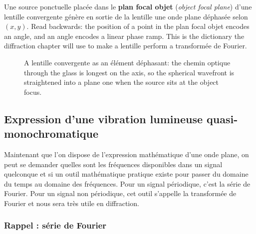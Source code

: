 \begin{conclusion}
  Une source ponctuelle placée dans le \textbf{plan focal objet}
  (\textit{object focal plane}) d'une lentille convergente génère en sortie de
  la lentille une onde plane déphasée selon $(x,y)$. Read backwards: the
  position of a point in the plan focal objet encodes an angle, and an angle
  encodes a linear phase ramp. This is the dictionary the diffraction chapter
  will use to make a lentille perform a transformée de Fourier.
\end{conclusion}

\begin{figure}[h!]
  \centering
  \caption*{\small A lentille convergente as an élément déphasant: the chemin
  optique through the glass is longest on the axis, so the spherical wavefront
  is straightened into a plane one when the source sits at the object focus.}
\end{figure}

\subsection{Expression d'une vibration lumineuse quasi-monochromatique}

Maintenant que l'on dispose de l'expression mathématique d'une onde plane, on
peut se demander quelles sont les fréquences disponibles dans un signal
quelconque et si un outil mathématique pratique existe pour passer du domaine du
temps au domaine des fréquences. Pour un signal périodique, c'est la série de
Fourier. Pour un signal non périodique, cet outil s'appelle la transformée de
Fourier et nous sera très utile en diffraction.

\subsubsection{Rappel : série de Fourier}

